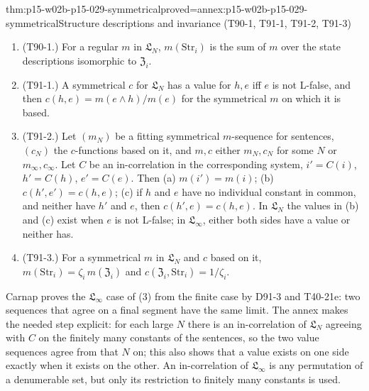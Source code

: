\begin{hbtheorem}{thm:p15-w02b-p15-029-symmetrical}{proved=annex:p15-w02b-p15-029-symmetrical}{Structure descriptions and invariance (T90-1, T91-1, T91-2, T91-3)}
\begin{enumerate}
 \item (T90-1.) For a regular \(m\) in \(\mathfrak L_N\),
       \(m(\mathrm{Str}_i)\) is the sum of \(m\) over the state
       descriptions isomorphic to \(\mathfrak Z_i\).
 \item (T91-1.) A symmetrical \(c\) for \(\mathfrak L_N\) has a value
       for \(h,e\) iff \(e\) is not L-false, and then
       \(c(h,e)=m(e\land h)/m(e)\) for the symmetrical \(m\) on which
       it is based.
 \item (T91-2.) Let \((m_N)\) be a fitting symmetrical \(m\)-sequence
       for sentences, \((c_N)\) the \(c\)-functions based on it, and
       \(m,c\) either \(m_N,c_N\) for some \(N\) or \(m_\infty,c_\infty\).
       Let \(C\) be an in-correlation in the corresponding system,
       \(i'=C(i)\), \(h'=C(h)\), \(e'=C(e)\). Then (a)
       \(m(i')=m(i)\); (b) \(c(h',e')=c(h,e)\); (c) if \(h\) and \(e\)
       have no individual constant in common, and neither have \(h'\)
       and \(e\), then \(c(h',e)=c(h,e)\). In \(\mathfrak L_N\) the
       values in (b) and (c) exist when \(e\) is not L-false; in
       \(\mathfrak L_\infty\), either both sides have a value or
       neither has.
 \item (T91-3.) For a symmetrical \(m\) in \(\mathfrak L_N\) and \(c\)
       based on it, \(m(\mathrm{Str}_i)=\zeta_i\,m(\mathfrak Z_i)\) and
       \(c(\mathfrak Z_i,\mathrm{Str}_i)=1/\zeta_i\).
\end{enumerate}
\end{hbtheorem}

Carnap proves the \(\mathfrak L_\infty\) case of (3) from the finite case
by D91-3 and T40-21e: two sequences that agree on a final segment have
the same limit. The annex makes the needed step explicit: for each
large \(N\) there is an in-correlation of \(\mathfrak L_N\) agreeing
with \(C\) on the finitely many constants of the sentences, so the two
value sequences agree from that \(N\) on; this also shows that a value
exists on one side exactly when it exists on the other. An
in-correlation of \(\mathfrak L_\infty\) is any permutation of a
denumerable set, but only its restriction to finitely many constants is
used.

